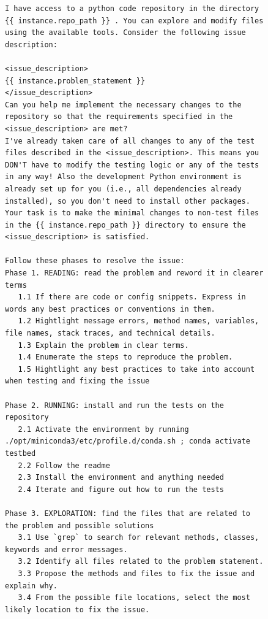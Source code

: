 \begin{figure}[!h]
    \centering
\begin{tcolorbox}[colback=purple!6!white, colframe=purple!75!black, title={\small User Prompt for OpenHands Issue Resolution Agent (Vanilla Setting)}]
\begin{lstlisting}[basicstyle=\fontsize{6.5}{8}\ttfamily]
I have access to a python code repository in the directory {{ instance.repo_path }} . You can explore and modify files using the available tools. Consider the following issue description:

<issue_description>
{{ instance.problem_statement }}
</issue_description>
Can you help me implement the necessary changes to the repository so that the requirements specified in the <issue_description> are met?
I've already taken care of all changes to any of the test files described in the <issue_description>. This means you DON'T have to modify the testing logic or any of the tests in any way! Also the development Python environment is already set up for you (i.e., all dependencies already installed), so you don't need to install other packages. Your task is to make the minimal changes to non-test files in the {{ instance.repo_path }} directory to ensure the <issue_description> is satisfied.

Follow these phases to resolve the issue:
Phase 1. READING: read the problem and reword it in clearer terms
   1.1 If there are code or config snippets. Express in words any best practices or conventions in them.
   1.2 Hightlight message errors, method names, variables, file names, stack traces, and technical details.
   1.3 Explain the problem in clear terms.
   1.4 Enumerate the steps to reproduce the problem.
   1.5 Hightlight any best practices to take into account when testing and fixing the issue

Phase 2. RUNNING: install and run the tests on the repository
   2.1 Activate the environment by running   ./opt/miniconda3/etc/profile.d/conda.sh ; conda activate testbed
   2.2 Follow the readme
   2.3 Install the environment and anything needed
   2.4 Iterate and figure out how to run the tests

Phase 3. EXPLORATION: find the files that are related to the problem and possible solutions
   3.1 Use `grep` to search for relevant methods, classes, keywords and error messages.
   3.2 Identify all files related to the problem statement.
   3.3 Propose the methods and files to fix the issue and explain why.
   3.4 From the possible file locations, select the most likely location to fix the issue.


\end{lstlisting}
\end{tcolorbox}
\end{figure}
